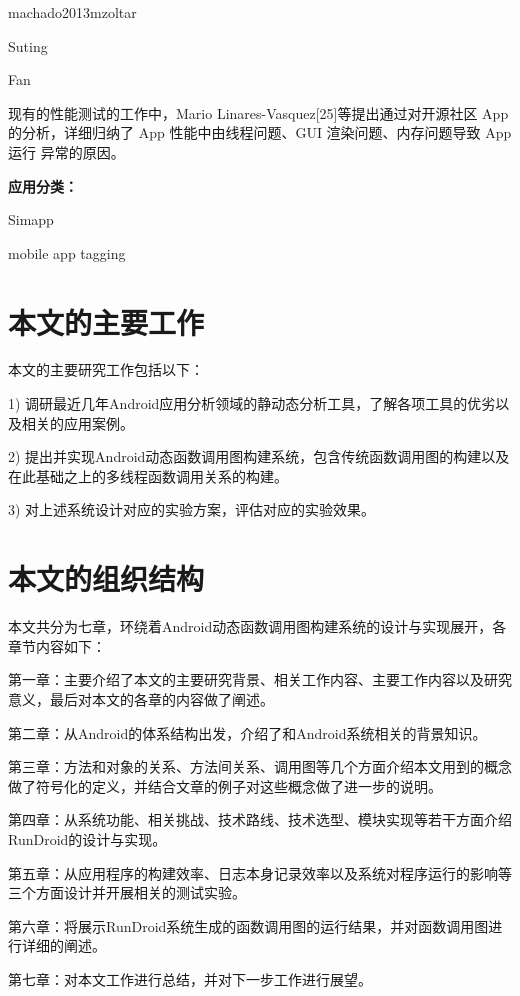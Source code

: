 machado2013mzoltar~\cite{machado2013mzoltar}

Suting~\cite{androidtest2}

Fan~\cite{fan2018efficiently, fan2018large}

现有的性能测试的工作中，Mario Linares-Vasquez[25]等提出通过对开源社区 App 的分析，详细归纳了 App 性能中由线程问题、GUI 渲染问题、内存问题导致 App 运行 异常的原因。

\textbf{应用分类：}

Simapp~\cite{chen2015simapp}

mobile app tagging ~\cite{chen2016mobile}



\section{本文的主要工作}

本文的主要研究工作包括以下：

1)	调研最近几年Android应用分析领域的静动态分析工具，了解各项工具的优劣以及相关的应用案例。

2)	提出并实现Android动态函数调用图构建系统，包含传统函数调用图的构建以及在此基础之上的多线程函数调用关系的构建。

3)	对上述系统设计对应的实验方案，评估对应的实验效果。

\section{本文的组织结构}

本文共分为七章，环绕着Android动态函数调用图构建系统的设计与实现展开，各章节内容如下：

第一章：主要介绍了本文的主要研究背景、相关工作内容、主要工作内容以及研究意义，最后对本文的各章的内容做了阐述。

第二章：从Android的体系结构出发，介绍了和Android系统相关的背景知识。

第三章：方法和对象的关系、方法间关系、调用图等几个方面介绍本文用到的概念做了符号化的定义，并结合文章的例子对这些概念做了进一步的说明。


第四章：从系统功能、相关挑战、技术路线、技术选型、模块实现等若干方面介绍RunDroid的设计与实现。

第五章：从应用程序的构建效率、日志本身记录效率以及系统对程序运行的影响等三个方面设计并开展相关的测试实验。

第六章：将展示RunDroid系统生成的函数调用图的运行结果，并对函数调用图进行详细的阐述。

第七章：对本文工作进行总结，并对下一步工作进行展望。


